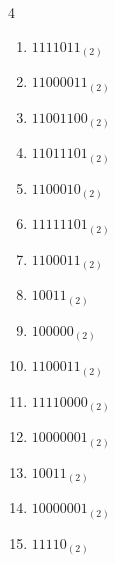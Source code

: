 \begin{multicols}{4}
\begin{enumerate}
        \phantom{$=242$}

  \item $1111011_{(2)}$

        \phantom{$=123$}

\columnbreak %

  \item $11000011_{(2)}$

        \phantom{$=195$}

  \item $11001100_{(2)}$

        \phantom{$=204$}

  \item $11011101_{(2)}$

        \phantom{$=221$}

  \item $1100010_{(2)}$

        \phantom{$=98$}

  \item $11111101_{(2)}$

        \phantom{$=253$}

  \item $1100011_{(2)}$

        \phantom{$=99$}

  \item $10011_{(2)}$

        \phantom{$=19$}

  \item $100000_{(2)}$

        \phantom{$=32$}

  \item $1100011_{(2)}$

        \phantom{$=99$}

  \item $11110000_{(2)}$

        \phantom{$=240$}

  \item $10000001_{(2)}$

        \phantom{$=129$}

  \item $10011_{(2)}$

        \phantom{$=19$}

  \item $10000001_{(2)}$

        \phantom{$=129$}

  \item $11110_{(2)}$


\end{enumerate}
\end{multicols}
